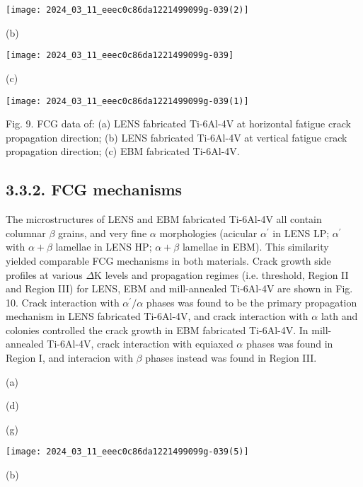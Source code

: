 \documentclass[10pt]{article}
\begin{document}
\begin{center}
\texttt{[image: 2024\_03\_11\_eeec0c86da1221499099g-039(2)]}
\end{center}

(b)

\begin{center}
\texttt{[image: 2024\_03\_11\_eeec0c86da1221499099g-039]}
\end{center}

(c)

\begin{center}
\texttt{[image: 2024\_03\_11\_eeec0c86da1221499099g-039(1)]}
\end{center}

Fig. 9. FCG data of: (a) LENS fabricated Ti-6Al-4V at horizontal fatigue crack propagation direction; (b) LENS fabricated Ti-6Al-4V at vertical fatigue crack propagation direction; (c) EBM fabricated Ti-6Al-4V.

\subsection*{3.3.2. FCG mechanisms}
The microstructures of LENS and EBM fabricated Ti-6Al-4V all contain columnar $\beta$ grains, and very fine $\alpha$ morphologies (acicular $\alpha^{\prime}$ in LENS LP; $\alpha^{\prime}$ with $\alpha+\beta$ lamellae in LENS HP; $\alpha+\beta$ lamellae in EBM). This similarity yielded comparable FCG mechanisms in both materials. Crack growth side profiles at various $\Delta \mathrm{K}$ levels and propagation regimes (i.e. threshold, Region II and Region III) for LENS, EBM and mill-annealed Ti-6Al-4V are shown in Fig. 10. Crack interaction with $\alpha^{\prime} / \alpha$ phases was found to be the primary propagation mechanism in LENS fabricated Ti-6Al-4V, and crack interaction with $\alpha$ lath and colonies controlled the crack growth in EBM fabricated Ti-6Al-4V. In mill-annealed Ti-6Al-4V, crack interaction with equiaxed $\alpha$ phases was found in Region I, and interacion with $\beta$ phases instead was found in Region III.

(a)

(d)

(g)

\begin{center}
\texttt{[image: 2024\_03\_11\_eeec0c86da1221499099g-039(5)]}
\end{center}

(b)
\end{document}
